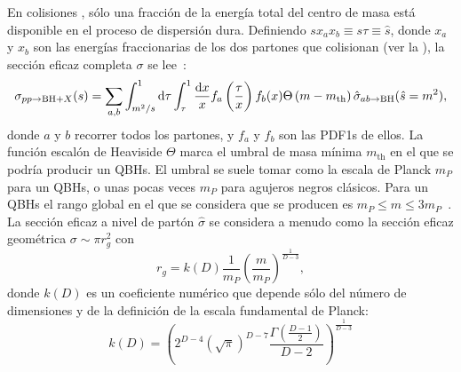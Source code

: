 En colisiones \pp, sólo una fracción de la energía total del centro de masa \sqs está disponible en el proceso de dispersión dura. Definiendo \(sx_ax_b \equiv s \tau \equiv \hat{s}\), donde \(x_a\) y \(x_b\) son las energías fraccionarias de los dos partones que colisionan (ver la \Sect{\ref{subsec:theory:sm:hadron_interactions}}), la sección eficaz completa \(\sigma\) se lee~\cite{Gingrich_Undseth-2020}:
\begin{equation*}
    \sigma_{pp \rightarrow \text{BH} + X}(s) =
    \sum_{a,b}
        \int_{m^2/s}^{1} \dd{\tau}
            \int_{\tau}^{1}
            \frac{\dd{x}}{x}
            f_a\left(\frac{\tau}{x}\right)
            f_b(x)
            \Theta\left(m - m_{\text{th}}\right)
            \hat{\sigma}_{ab\rightarrow \text{BH}} (\hat{s} = m^2),
\end{equation*}
donde \(a\) y \(b\) recorrer todos los partones, y \(f_a\) y \(f_b\) son las \acp{PDF1} de ellos. La función escalón de Heaviside \(\Theta\) marca el umbral de masa mínima \(m_{\text{th}}\) en el que se podría producir un \acp{QBH}.
El umbral se suele tomar como la escala de Planck \(m_P\) para un \acp{QBH}, o unas pocas veces \(m_P\) para agujeros negros clásicos. Para un \acp{QBH} el rango global en el que se considera que se producen es \(m_P \leq m \leq 3m_P\)~\cite{Gingrich-2010}.
La sección eficaz a nivel de part\'on \(\hat{\sigma}\) se considera a menudo como la sección eficaz geométrica \(\sigma \sim \pi r_g^2\) con
\begin{equation*}
    r_g = k(D) \frac{1}{m_P} \left(\frac{m}{m_P}\right)^{\frac{1}{D-3}},
\end{equation*}
donde \(k(D)\) es un coeficiente numérico que depende sólo del número de dimensiones y de la definición de la escala fundamental de Planck:
\begin{equation*}
    k(D) = 
    \left(
        2^{D-4}
        \left(\sqrt{\pi}\right)^{D-7}
        \frac{\Gamma \left(\frac{D-1}{2}\right)}{D-2}
    \right)
    ^{\frac{1}{D-3}}
\end{equation*}

